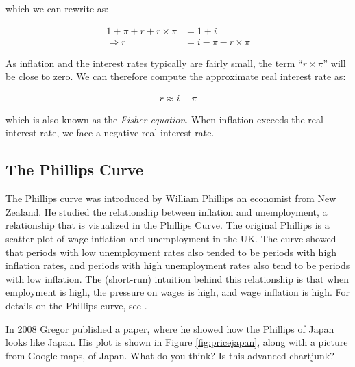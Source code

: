 \documentclass[]{book}
\begin{document}
which we can rewrite as:

\begin{align}
    1+\pi+r+r\times \pi&= 1+i\nonumber\\
 \Rightarrow    r&= i-\pi-r\times \pi
\end{align}

As inflation and the interest rates typically are fairly small, the term ``\(r\times \pi\)'' will be close to zero. We can therefore compute the approximate real interest rate as:

\begin{align}
    r\approx i-\pi
\end{align}

which is also known as the \emph{Fisher equation}. When inflation exceeds the real interest rate, we face a negative real interest rate.

\hypertarget{the-phillips-curve}{%
\subsection{The Phillips Curve}\label{the-phillips-curve}}

The Phillips curve was introduced by William Phillips an economist from New Zealand. He studied the relationship between inflation and unemployment, a relationship that is visualized in the Phillips Curve. The original Phillips is a scatter plot of wage inflation and unemployment in the UK. The curve showed that periods with low unemployment rates also tended to be periods with high inflation rates, and periods with high unemployment rates also tend to be periods with low inflation. The (short-run) intuition behind this relationship is that when employment is high, the pressure on wages is high, and wage inflation is high. For details on the Phillips curve, see \citep[p.~646 in][]{core} .

In 2008 Gregor \citep{smith2008japan} published a paper, where he showed how the Phillips of Japan looks like Japan. His plot is shown in Figure \ref{fig:pricejapan}, along with a picture from Google maps, of Japan. What do you think? Is this advanced chartjunk?
\end{document}
